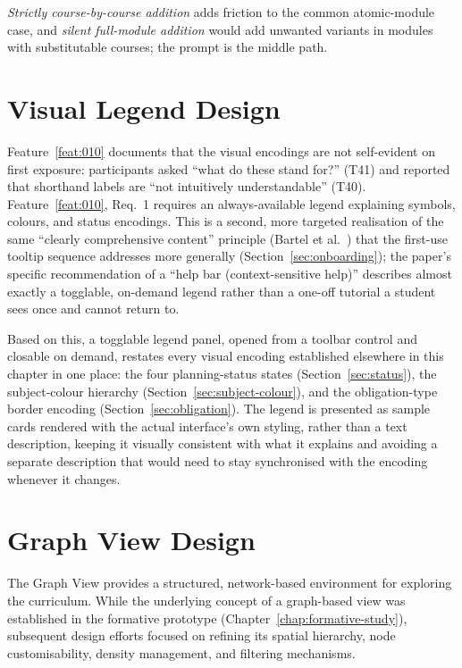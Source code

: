 \emph{Strictly course-by-course addition} adds friction to the common atomic-module case, and \emph{silent full-module addition} would add unwanted variants in modules with substitutable courses; the prompt is the middle path.



\section{Visual Legend Design}
\label{sec:legend}
Feature~\ref{feat:010} documents that the visual encodings are not self-evident on first exposure: participants asked \enquote{what do these stand for?} (T41) and reported that shorthand labels are \enquote{not intuitively understandable} (T40). Feature~\ref{feat:010}, Req.~1 requires an always-available legend explaining symbols, colours, and status encodings. This is a second, more targeted realisation of the same \enquote{clearly comprehensive content} principle (Bartel et al.~\cite{bartel_design_2024}) that the first-use tooltip sequence addresses more generally (Section~\ref{sec:onboarding}); the paper's specific recommendation of a \enquote{help bar (context-sensitive help)} describes almost exactly a togglable, on-demand legend rather than a one-off tutorial a student sees once and cannot return to.

Based on this, a togglable legend panel, opened from a toolbar control and closable on demand, restates every visual encoding established elsewhere in this chapter in one place: the four planning-status states (Section~\ref{sec:status}), the subject-colour hierarchy (Section~\ref{sec:subject-colour}), and the obligation-type border encoding (Section~\ref{sec:obligation}). The legend is presented as sample cards rendered with the actual interface's own styling, rather than a text description, keeping it visually consistent with what it explains and avoiding a separate description that would need to stay synchronised with the encoding whenever it changes.


\section{Graph View Design}
\label{sec:graph-spatial}
The Graph View provides a structured, network-based environment for exploring the curriculum. While the underlying concept of a graph-based view was established in the formative prototype (Chapter~\ref{chap:formative-study}), subsequent design efforts focused on refining its spatial hierarchy, node customisability, density management, and filtering mechanisms.

